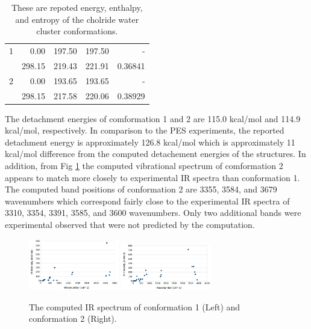 \documentclass[11pt]{article}
\begin{document}
\begin{table}[htbp]
\caption{These are repoted energy, enthalpy, and entropy
  of the cholride water cluster conformations.}
\begin{tabular}{R|RRRR}
   & &
  &
   &  \\
  &0.00&197.50&197.50&- \\
   &298.15&219.43&221.91&0.36841 \\
  2&0.00&193.65&193.65&- \\
   &298.15&217.58&220.06&0.38929 \\
\end{tabular}
\label{tab:energies2}
\end{table}

The detachment energies of comformation 1 and 2 are 115.0 kcal/mol and
114.9 kcal/mol, respectively. In comparison to the PES experiments,
the reported detachment energy is approximately 126.8 kcal/mol which
is approximately 11 kcal/mol difference from the computed detachement
energies of the structures\cite{doi:10.1063/1.467965}. In addition, from Fig \ref{fig:conf_IR}
the computed vibrational spectrum of comformation 2 appears to match
more closely to experimental IR spectra than conformation 1. The computed
band positions of conformation 2 are 3355, 3584, and 3679 wavenumbers
which correspond fairly close to the experimental IR spectra of
3310, 3354, 3391, 3585, and 3600 wavenumbers\cite{doi:10.1063/1.478616}.
Only two additional bands were experimental observed that were not
predicted by the computation.

\begin{figure}[H]
  \centering
  \includegraphics[width=0.35\textwidth]{conf_1IR.png}
  \includegraphics[width=0.35\textwidth]{conf_2IR.png}
  \caption{The computed IR spectrum of conformation 1 (Left) and
    conformation 2 (Right).}
  \label{fig:conf_IR}
\end{figure}
\end{document}
